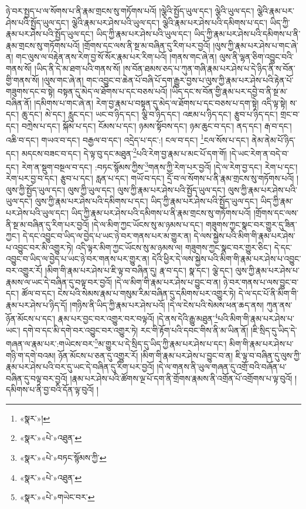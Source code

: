 ཉེ་བར་སྤྱད་པ་ལ་སོགས་པ་ནི་རྣམ་གྲངས་སུ་གཏོགས་པའོ། །ལྕེའི་སྤྱོད་ཡུལ་དང་། ལྕེའི་ཡུལ་དང་། ལྕེའི་རྣམ་པར་ཤེས་པའི་སྤྱོད་ཡུལ་དང་། ལྕེའི་རྣམ་པར་ཤེས་པའི་ཡུལ་དང་། ལྕེའི་རྣམ་པར་ཤེས་པའི་དམིགས་པ་དང་། ཡིད་ཀྱི་རྣམ་པར་ཤེས་པའི་སྤྱོད་ཡུལ་དང་། ཡིད་ཀྱི་རྣམ་པར་ཤེས་པའི་ཡུལ་དང་། ཡིད་ཀྱི་རྣམ་པར་ཤེས་པའི་དམིགས་པ་ནི་རྣམ་གྲངས་སུ་གཏོགས་པའོ། །གྲོགས་དང་ལས་ནི་སྔ་མ་བཞིན་དུ་རིག་པར་བྱའོ། །ལུས་ཀྱི་རྣམ་པར་ཤེས་པ་གང་ཞེ་ན། གང་ལུས་ལ་བརྟེན་ནས་རེག་བྱ་སོ་སོར་རྣམ་པར་རིག་པའོ། །གནས་གང་ཞེ་ན། ལུས་ནི་ལྷན་ཅིག་འབྱུང་བའི་གནས་སོ། །ཡིད་ནི་དེ་མ་ཐག་པའི་གནས་སོ། །ས་བོན་ཐམས་ཅད་པ་ཀུན་གཞི་རྣམ་པར་ཤེས་པ་དེ་ཉིད་ནི་ས་བོན་གྱི་གནས་སོ། །ལུས་གང་ཞེ་ན། གང་འབྱུང་བ་ཆེན་པོ་བཞི་པོ་དག་རྒྱུར་བྱས་པ་ལུས་ཀྱི་རྣམ་པར་ཤེས་པའི་རྟེན་པོ་གཟུགས་དང་བ་སྟེ། བསྟན་དུ་མེད་ལ་ཐོགས་པ་དང་བཅས་པའོ། །ཡིད་དང་ས་བོན་གྱི་རྣམ་པར་དབྱེ་བ་ནི་སྔ་མ་བཞིན་ནོ། །དམིགས་པ་གང་ཞེ་ན། རེག་བྱ་རྣམ་པ་བསྟན་དུ་མེད་ལ་ཐོགས་པ་དང་བཅས་པ་དག་སྟེ། འདི་ལྟ་སྟེ། ས་དང་། ཆུ་དང་། མེ་དང་། རླུང་དང་། ཡང་བ་ཉིད་དང་། ལྕི་བ་ཉིད་དང་། འཇམ་པ་ཉིད་དང་། རྩུབ་པ་ཉིད་དང་། གྲང་བ་དང་། བཀྲེས་པ་དང་། སྐོམ་པ་དང་། ངོམས་པ་དང་། ཉམས་སྟོབས་དང་། ཉམ་ཆུང་བ་དང་། ནད་དང་། རྒ་བ་དང་། འཆི་བ་དང་། གཡའ་བ་དང་། བརྒྱལ་བ་དང་། འདྲེད་པ་དང་:། ངལ་བ་དང་། \footnote{«སྣར་»།  }ངལ་སོས་པ་དང་། ནེམ་ནེམ་པོ་ཉིད་དང་། མདངས་བཟང་བ་དང་། དེ་ལྟ་བུ་དང་མཐུན་\footnote{«སྣར་»«པེ་»འཐུན་}པའི་རེག་བྱ་རྣམ་པ་མང་པོ་དག་གོ། །དེ་ཡང་རེག་ན་བདེ་བ་དང་། རེག་ན་སྡུག་བསྔལ་བ་དང་། :བཏང་སྙོམས་ཀྱིས་\footnote{«སྣར་»«པེ་»བཏང་སྙོམས་ཀྱི་}གནས་ཀྱི་རེག་པར་བྱའོ། །དེ་ལ་རེག་བྱ་དང་། རེག་པ་དང་། རེག་པར་བྱ་བ་དང་། རྩུབ་པ་དང་། རླན་པ་དང་། གཡོ་བ་དང་། དྲོ་བ་ལ་སོགས་པ་ནི་རྣམ་གྲངས་སུ་གཏོགས་པའོ། །ལུས་ཀྱི་སྤྱོད་ཡུལ་དང་། ལུས་ཀྱི་ཡུལ་དང་། ལུས་ཀྱི་རྣམ་པར་ཤེས་པའི་སྤྱོད་ཡུལ་དང་། ལུས་ཀྱི་རྣམ་པར་ཤེས་པའི་ཡུལ་དང་། ལུས་ཀྱི་རྣམ་པར་ཤེས་པའི་དམིགས་པ་དང་། ཡིད་ཀྱི་རྣམ་པར་ཤེས་པའི་སྤྱོད་ཡུལ་དང་། ཡིད་ཀྱི་རྣམ་པར་ཤེས་པའི་ཡུལ་དང་། ཡིད་ཀྱི་རྣམ་པར་ཤེས་པའི་དམིགས་པ་ནི་རྣམ་གྲངས་སུ་གཏོགས་པའོ། །གྲོགས་དང་ལས་ནི་སྔ་མ་བཞིན་དུ་རིག་པར་བྱའོ། །དེ་ལ་མིག་ཀྱང་ཡོངས་སུ་མ་ཉམས་པ་དང་། གཟུགས་ཀྱང་སྣང་བར་གྱུར་དུ་ཟིན་ཀྱང་། དེ་དང་འབྱུང་བ་ཡིད་ལ་བྱེད་པ་ཡང་ཉེ་བར་གནས་པར་མ་གྱུར་ན། དེ་ལས་སྐྱེས་པའི་མིག་གི་རྣམ་པར་ཤེས་པ་འབྱུང་བར་མི་འགྱུར་ཏེ། འདི་ལྟར་མིག་ཀྱང་ཡོངས་སུ་མ་ཉམས་ལ། གཟུགས་ཀྱང་སྣང་བར་གྱུར་ཅིང་། དེ་དང་འབྱུང་བ་ཡིད་ལ་བྱེད་པ་ཡང་ཉེ་བར་གནས་པར་གྱུར་ན། དེའི་ཕྱིར་དེ་ལས་སྐྱེས་པའི་མིག་གི་རྣམ་པར་ཤེས་པ་འབྱུང་བར་འགྱུར་རོ། །མིག་གི་རྣམ་པར་ཤེས་པ་ཇི་ལྟ་བ་བཞིན་དུ། རྣ་བ་དང་། སྣ་དང་། ལྕེ་དང་། ལུས་ཀྱི་རྣམ་པར་ཤེས་པ་རྣམས་ལ་ཡང་དེ་བཞིན་དུ་བལྟ་བར་བྱའོ། །དེ་ལ་མིག་གི་རྣམ་པར་ཤེས་པ་བྱུང་བ་ན། ཉེ་བར་གནས་པ་ལས་བྱུང་བ་དང་། ཚོལ་བ་དང་། ངེས་པའི་སེམས་རྣམ་པ་གསུམ་རིམ་བཞིན་དུ་དམིགས་པར་འགྱུར་ཏེ། དེ་ལ་དང་པོ་ནི་མིག་གི་རྣམ་པར་ཤེས་པ་ཉིད་དོ། །གཉིས་ནི་ཡིད་ཀྱི་རྣམ་པར་ཤེས་པའོ། །དེ་ལ་ངེས་པའི་སེམས་ཕན་ཆད་ནས། ཀུན་ནས་ཉོན་མོངས་པ་དང་། རྣམ་པར་བྱང་བར་འགྱུར་བར་བལྟའོ། །དེ་ནས་དེའི་རྒྱུ་མཐུན་\footnote{«སྣར་»«པེ་»འཐུན་}པའི་མིག་གི་རྣམ་པར་ཤེས་པ་ཡང་། དགེ་བ་དང་མི་དགེ་བར་འབྱུང་བར་འགྱུར་ཏེ། རང་གི་རྟོག་པའི་དབང་གིས་ནི་མ་ཡིན་ནོ། །ཇི་སྲིད་དུ་ཡིད་དེ་གཞན་ལ་རྣམ་པར་:གཡེངས་བར་\footnote{«སྣར་»«པེ་»གཡེང་བར་}མ་གྱུར་པ་དེ་སྲིད་དུ་ཡིད་ཀྱི་རྣམ་པར་ཤེས་པ་དང་། མིག་གི་རྣམ་པར་ཤེས་པ་གཉི་ག་དགེ་བའམ། ཉོན་མོངས་པ་ཅན་དུ་འགྱུར་རོ། །མིག་གི་རྣམ་པར་ཤེས་པ་བྱུང་བ་ན། ཇི་ལྟ་བ་བཞིན་དུ་ལུས་ཀྱི་རྣམ་པར་ཤེས་པའི་བར་དུ་ཡང་དེ་བཞིན་དུ་རིག་པར་བྱའོ། །དེ་ལ་གནས་ནི་ཡུལ་གཞན་དུ་འགྲོ་བའི་བཞོན་པ་བཞིན་དུ་བལྟ་བར་བྱའོ། །རྣམ་པར་ཤེས་པའི་ཚོགས་ལྔ་པོ་དག་ནི་གྲོགས་རྣམས་ནི་འགྲོན་པོ་འགྲོགས་པ་ལྟ་བུའོ། །དམིགས་པ་ནི་བྱ་བའི་དོན་ལྟ་བུའོ། །
